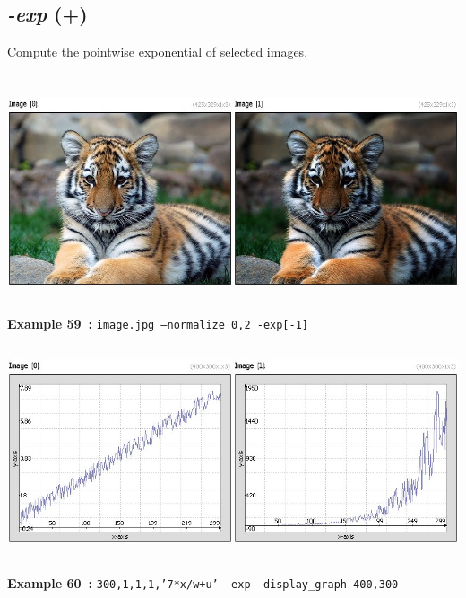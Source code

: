 \documentclass[a4paper,11pt,twoside]{book}
\begin{document}
\subsection{\emph{-exp} (+)}\vspace*{-0.5em}
Compute the pointwise exponential of selected images.
\begin{center}\includegraphics[keepaspectratio=true,height=7cm,width=\textwidth]{img/gmic_def59.jpg}\\
{\footnotesize \textbf{Example 59~:} \texttt{image.jpg --normalize 0,2 -exp[-1]}}
\\\includegraphics[keepaspectratio=true,height=7cm,width=\textwidth]{img/gmic_def60.jpg}\\
{\footnotesize \textbf{Example 60~:} \texttt{300,1,1,1,'7*x/w+u' --exp -display\_graph 400,300}}
\end{center}
\end{document}
